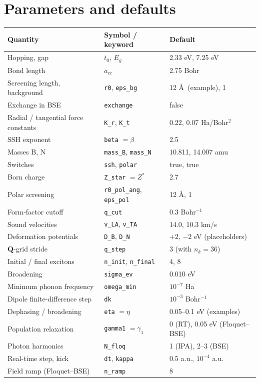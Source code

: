 \documentclass[11pt,a4paper]{article}
\newcommand{\QQ}{\bm{Q}}
\newcommand{\code}[1]{\texttt{#1}}
\begin{document}
\appendix
\section{Parameters and defaults}
\label{app:par}

\begin{center}
\begin{tabular}{@{}lll@{}}
\toprule
Quantity & Symbol / keyword & Default \\
\midrule
Hopping, gap & $t_0$, $E_g$ & 2.33 eV, 7.25 eV \\
Bond length & $a_{cc}$ & 2.75 Bohr \\
Screening length, background & \code{r0}, \code{eps\_bg} & 12 \AA\ (example), 1 \\
Exchange in BSE & \code{exchange} & false \\
Radial / tangential force constants & \code{K\_r}, \code{K\_t} & 0.22, 0.07 Ha/Bohr$^2$ \\
SSH exponent & \code{beta} $=\beta$ & 2.5 \\
Masses B, N & \code{mass\_B}, \code{mass\_N} & 10.811, 14.007 amu \\
Switches & \code{ssh}, \code{polar} & true, true \\
Born charge & \code{Z\_star} $=Z^*$ & 2.7 \\
Polar screening & \code{r0\_pol\_ang}, \code{eps\_pol} & 12 \AA, 1 \\
Form-factor cutoff & \code{q\_cut} & 0.3 Bohr$^{-1}$ \\
Sound velocities & \code{v\_LA}, \code{v\_TA} & 14.0, 10.3 km/s \\
Deformation potentials & \code{D\_B}, \code{D\_N} & $+2$, $-2$ eV (placeholders) \\
$\QQ$-grid stride & \code{q\_step} & 3 (with $n_k=36$) \\
Initial / final excitons & \code{n\_init}, \code{n\_final} & 4, 8 \\
Broadening & \code{sigma\_ev} & 0.010 eV \\
Minimum phonon frequency & \code{omega\_min} & $10^{-7}$ Ha \\
Dipole finite-difference step & \code{dk} & $10^{-3}$ Bohr$^{-1}$ \\
Dephasing / broadening & \code{eta} $=\eta$ & 0.05--0.1 eV (examples) \\
Population relaxation & \code{gamma1} $=\gamma_1$ & 0 (RT), 0.05 eV (Floquet--BSE) \\
Photon harmonics & \code{N\_floq} & 1 (IPA), 2--3 (BSE) \\
Real-time step, kick & \code{dt}, \code{kappa} & 0.5 a.u., $10^{-4}$ a.u. \\
Field ramp (Floquet--BSE) & \code{n\_ramp} & 8 \\
\bottomrule
\end{tabular}
\end{center}
\end{document}
